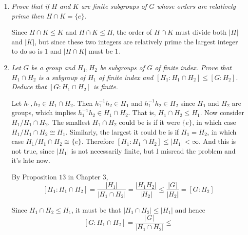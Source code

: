 \documentclass[letterpaper, 11pt]{article}
\begin{document}
\begin{enumerate}
\item \emph{Prove that if $H$ and $K$ are finite subgroups of $G$ whose orders are relatively prime then $H \cap K = \{e\}$.}

Since $H \cap K \leq K$ and $H \cap K \leq H$, the order of $H \cap K$ must divide both $|H|$ and $|K|$, but since these two integers are relatively prime the largest integer to do so is $1$ and $|H \cap K|$ must be $1$.

\item \emph{Let $G$ be a group and $H_1, H_2$ be subgroups of $G$ of finite index.  Prove that $H_1 \cap H_2$ is a subgroup of $H_1$ of finite index and $[H_1 : H_1 \cap H_2] \leq [G: H_2]$.  Deduce that $[G: H_1 \cap H_2]$ is finite.}

Let $h_1, h_2 \in H_1 \cap H_2$.  Then $h_1^{-1}h_2 \in H_1$ and $h_1^{-1}h_2 \in H_2$ since $H_1$ and $H_2$ are groups, which implies $h_1^{-1}h_2 \in H_1 \cap H_2$.  That is, $H_1 \cap H_2 \leq H_1$.  Now consider $H_1 / H_1 \cap H_2$.  The smallest $H_1 \cap H_2$ could be is if it were $\{e\}$, in which case $H_1 / H_1 \cap H_2 \cong H_1$.  Similarly, the largest it could be is if $H_1 = H_2$, in which case $H_1 / H_1 \cap H_2 \cong \{e\}$.  Therefore $[H_1 : H_1 \cap H_2] \leq |H_1| < \infty$.  And this is not true, since $|H_1|$ is not necessarily finite, but I misread the problem and it's late now.

By Proposition $13$ in Chapter $3$,
\[
[H_1 : H_1 \cap H_2] = \frac{|H_1|}{|H_1 \cap H_2|} = \frac{|H_1H_2|}{|H_2|} \leq \frac{|G|}{|H_2|} = [G: H_2]
\]

Since $H_1 \cap H_2 \leq H_1$, it must be that $|H_1 \cap H_2| \leq |H_1|$ and hence
\[
[G : H_1 \cap H_2] = \frac{|G|}{|H_1 \cap H_2|} \leq 
\]
\end{enumerate}
\end{document}
